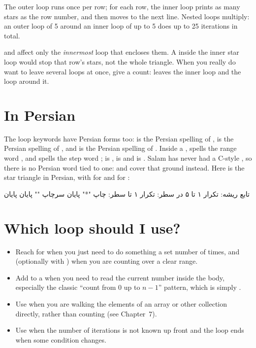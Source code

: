 The outer loop runs once per row; for each row, the inner loop prints as many
stars as the row number, and then  moves to the next line.
Nested loops multiply: an outer loop of 5 around an inner loop of up to 5 does up
to 25 iterations in total.

\begin{warn}
 and  affect only the \emph{innermost} loop that
encloses them. A  inside the inner star loop would stop that row's
stars, not the whole triangle. When you really do want to leave several loops at
once, give  a count:  leaves the inner loop and the
loop around it.
\end{warn}

\section{In Persian}

The loop keywords have Persian forms too:  is the Persian
spelling of ,  is the Persian spelling of
, and  is the Persian spelling of . Inside
a ,  spells the range word , and
 spells the step word ;  is ,
 is  and  is .
Salam has never had a C-style , so there is no Persian word tied to
one:  and  cover that ground instead. Here is the star
triangle in Persian, with  for  and
 for :

\begin{salamfa}
تابع ریشه:
    تکرار ۱ تا ۵ در سطر:
        تکرار ۱ تا سطر:
            چاپ "*"
        پایان
        سرچاپ ""
    پایان
پایان
\end{salamfa}

\section{Which loop should I use?}

\begin{itemize}[leftmargin=1.4em]
  \item Reach for  when you just need to do something a set number
        of times, and  (optionally with ) when you
        are counting over a clear range.
  \item Add  to a  when you need to read the current
        number inside the body, especially the classic ``count from 0 up to
        $n - 1$'' pattern, which is simply .
  \item Use  when you are walking the elements of an array or other
        collection directly, rather than counting (see Chapter~7).
  \item Use  when the number of iterations is not known up front and
        the loop ends when some condition changes.
\end{itemize}

